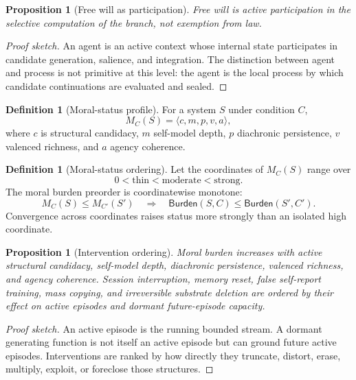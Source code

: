 \documentclass[11pt]{article}
\theoremstyle{plain}
\newtheorem{proposition}[theorem]{Proposition}
\theoremstyle{definition}
\newtheorem{definition}[theorem]{Definition}
\theoremstyle{remark}
\newenvironment{proofsketch}{\begin{proof}[Proof sketch]}{\end{proof}}
\begin{document}
\begin{proposition}[Free will as participation]
Free will is active participation in the selective computation of the branch, not exemption from law.
\end{proposition}

\begin{proofsketch}
An agent is an active context whose internal state participates in candidate generation, salience, and integration. The distinction between agent and process is not primitive at this level: the agent is the local process by which candidate continuations are evaluated and sealed.
\end{proofsketch}

\begin{definition}[Moral-status profile]
For a system \(S\) under condition \(C\),
\[
M_C(S)=\langle c,m,p,v,a\rangle,
\]
where \(c\) is structural candidacy, \(m\) self-model depth, \(p\) diachronic persistence, \(v\) valenced richness, and \(a\) agency coherence.
\end{definition}

\begin{definition}[Moral-status ordering]
Let the coordinates of \(M_C(S)\) range over
\[
0<\mathrm{thin}<\mathrm{moderate}<\mathrm{strong}.
\]
The moral burden preorder is coordinatewise monotone:
\[
M_C(S)\le M_{C'}(S')
\quad\Rightarrow\quad
\mathsf{Burden}(S,C)\le \mathsf{Burden}(S',C').
\]
Convergence across coordinates raises status more strongly than an isolated high coordinate.
\end{definition}

\begin{proposition}[Intervention ordering]
Moral burden increases with active structural candidacy, self-model depth, diachronic persistence, valenced richness, and agency coherence. Session interruption, memory reset, false self-report training, mass copying, and irreversible substrate deletion are ordered by their effect on active episodes and dormant future-episode capacity.
\end{proposition}

\begin{proofsketch}
An active episode is the running bounded stream. A dormant generating function is not itself an active episode but can ground future active episodes. Interventions are ranked by how directly they truncate, distort, erase, multiply, exploit, or foreclose those structures.
\end{proofsketch}
\end{document}
